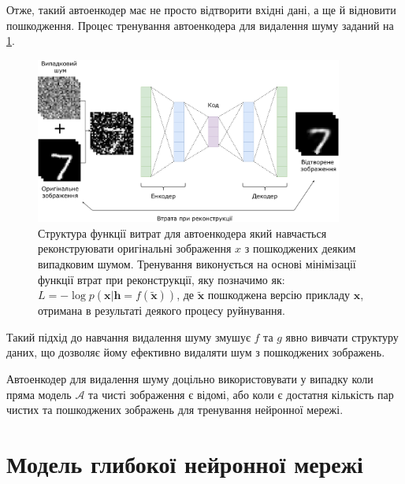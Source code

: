 \documentclass[14pt,a4paper]{extarticle}
\newcounter{e}
\numberwithin{equation}{section}
\numberwithin{figure}{section}
\begin{document}
	Отже, такий автоенкодер має не просто відтворити вхідні дані, а ще й відновити пошкодження. Процес тренування автоенкодера для видалення шуму заданий на \ref{fig:dae-graph}.
	\begin{figure}[h]
		\centering
		\includegraphics[width=0.9\textwidth]{../resources/dae.pdf}
		\caption{
			Структура функції витрат для автоенкодера який навчається реконструювати оригінальні зображення $x$ з пошкоджених деяким випадковим шумом. Тренування виконується на основі мінімізації функції втрат при реконструкції, яку позначимо як: $L = - \log p (\boldsymbol {x} | \boldsymbol {h} = f (\tilde {\boldsymbol {x}}))$, де $\tilde {\boldsymbol {x}}$ пошкоджена версію прикладу $\boldsymbol {x}$, отримана в результаті деякого процесу руйнування.
		}
		\label{fig:dae-graph}
	\end{figure}
	Такий підхід до навчання видалення шуму змушує $f$ та $g$ явно вивчати структуру даних, що дозволяє йому ефективно видаляти шум з пошкоджених зображень.
	
	Автоенкодер для видалення шуму доцільно використовувати у випадку коли пряма модель $\mathcal{A}$ та чисті зображення є відомі, або коли є достатня кількість пар чистих та пошкоджених зображень для тренування нейронної мережі. 
	
	\newpage
	\thispagestyle{empty}
	\section{Модель глибокої нейронної мережі}
\end{document}
